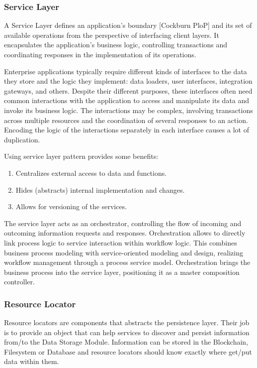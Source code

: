\subsubsection{Service Layer}\label{sec:ServiceLayer}
A Service Layer defines an application's boundary [Cockburn PloP] and its set of available operations from the perspective of interfacing client layers. It encapsulates the application's business logic, controlling transactions and coordinating responses in the implementation of its operations.

Enterprise applications typically require different kinds of interfaces to the data they store and the logic they implement: data loaders, user interfaces, integration gateways, and others. Despite their different purposes, these interfaces often need common interactions with the application to access and manipulate its data and invoke its business logic. The interactions may be complex, involving transactions across multiple resources and the coordination of several responses to an action. Encoding the logic of the interactions separately in each interface causes a lot of duplication.

Using service layer pattern provides some benefits:

\begin{enumerate}
\item Centralizes external access to data and functions.
\item Hides (abstracts) internal implementation and changes.
\item Allows for versioning of the services.
\end{enumerate}

The service layer acts as an orchestrator, controlling the flow of incoming and outcoming information requests and responses. Orchestration allows to directly link process logic to service interaction within workflow logic. This combines business process modeling with service-oriented modeling and design, realizing workflow management through a process service model. Orchestration brings the business process into the service layer, positioning it as a master composition controller.

\subsubsection{Resource Locator}\label{sec:ResourceLocator}

Resource locators are components that abstracts the persistence layer. Their job is to provide an object that can help services to discover and persist information from/to the Data Storage Module. Information can be stored in the Blockchain, Filesystem or Database and resource locators should know exactly where get/put data within them.  